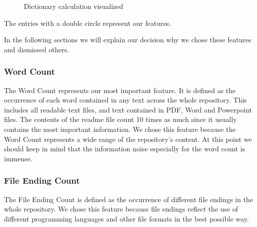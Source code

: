 \documentclass[paper=A4,pagesize=auto,12pt,headinclude=true,footinclude=true,BCOR=0mm,DIV=calc]{scrartcl}
\begin{document}
	\begin{figure}[H]
		\caption{Dictionary calculation visualized}
	\end{figure}
	The entries with a double circle represent our features.
	
	In the following sections we will explain our decision why we chose these features and dismissed others.
	
	\subsubsection{Word Count}
	The Word Count represents our most important feature. It is defined as the occurrence of each word contained in any text across the whole repository. This includes all readable text files, and text contained in PDF, Word and Powerpoint files. The contents of the readme file count 10 times as much since it usually contains the most important information. 
	We chose this feature because the Word Count represents a wide range of the repository’s content. At this point we should keep in mind that the information noise especially for the word count is immense. 
	
	\subsubsection{File Ending Count}
	
	The File Ending Count is defined as the occurrence of different file endings in the whole repository. We chose this feature because file endings reflect the use of different programming languages and other file formats in the best possible way.
	
\end{document}
